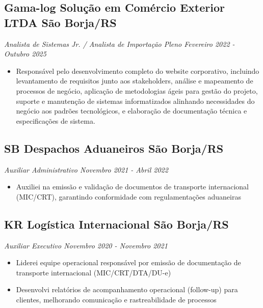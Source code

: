 \documentclass[a4paper,10pt]{article}
\begin{document}
    \subsection*{\texorpdfstring{
            \textbf{Gama-log Solução em Comércio Exterior LTDA} \hfill São Borja/RS
        }{
            Gama-log Solução em Comércio Exterior LTDA -- São Borja
        }}
    \textit{Analista de Sistemas Jr. / Analista de Importação Pleno \hfill Fevereiro 2022 - Outubro 2025}
        \begin{itemize}
            \item Responsável pelo desenvolvimento completo do website corporativo, incluindo levantamento de requisitos junto aos stakeholders, análise e mapeamento de processos de negócio, aplicação de metodologias ágeis para gestão do projeto, suporte e manutenção de sistemas informatizados alinhando necessidades do negócio aos padrões tecnológicos, e elaboração de documentação técnica e especificações de sistema.
        \end{itemize}

    \subsection*{\texorpdfstring{
            \textbf{SB Despachos Aduaneiros} \hfill São Borja/RS
        }{
            SB Despachos Aduaneiros -- São Borja
        }}
    \textit{Auxiliar Administrativo \hfill Novembro 2021 - Abril 2022}
        \begin{itemize}
            \item Auxiliei na emissão e validação de documentos de transporte internacional (MIC/CRT), garantindo conformidade com regulamentações aduaneiras
        \end{itemize}

    \subsection*{\texorpdfstring{
            \textbf{KR Logística Internacional} \hfill São Borja/RS
        }{
            KR Logística Internacional -- São Borja
        }}
    \textit{Auxiliar Executivo \hfill Novembro 2020 - Novembro 2021}
        \begin{itemize}
            \item Liderei equipe operacional responsável por emissão de documentação de transporte internacional (MIC/CRT/DTA/DU-e)
            \item Desenvolvi relatórios de acompanhamento operacional (follow-up) para clientes, melhorando comunicação e rastreabilidade de processos
        \end{itemize}
\end{document}

